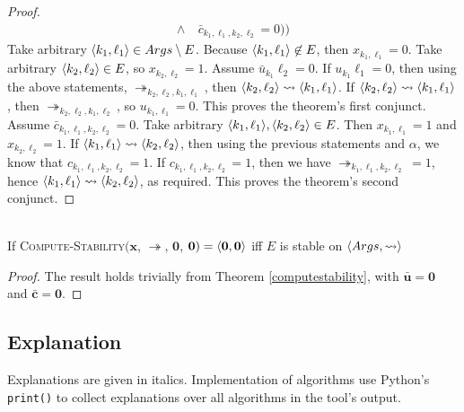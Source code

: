 \begin{theorem}
\begin{proof}
\begin{align*}
			\land\ &\bar{c}_{k_1,\ell_1,k_2,\ell_2}=0))
		\end{align*}
		Take arbitrary $\langle{k_1},{\ell_1}\rangle\in Args\setminus E$. Because $\langle{k_1},{\ell_1}\rangle\not\in E$, then $x_{k_1,\ell_1}=0$. Take arbitrary $\langle{k_2},{\ell_2}\rangle\in E$, so $x_{k_2,\ell_2}=1$. Assume $\bar{u}_{k_1}{\ell_2}=0$. If $u_{k_1}{\ell_1}=0$, then using the above statements, $\twoheadrightarrow_{k_2,\ell_2,k_1,\ell_1}$, then $\langle{k_2},{\ell_2}\rangle\rightsquigarrow\langle{k_1},{\ell_1}\rangle$. If $\langle{k_2},{\ell_2}\rangle\rightsquigarrow\langle{k_1},{\ell_1}\rangle$, then $\twoheadrightarrow_{k_2,\ell_2,k_1,\ell_2}$, so $u_{k_1,\ell_1}=0$. This proves the theorem's first conjunct.
		\linespace
		Assume $\bar{c}_{k_1,\ell_1,k_2,\ell_2}=0$. Take arbitrary $\langle{k_1},{\ell_1}\rangle,\langle{k_2},{\ell_2}\rangle\in E$. Then $x_{k_1,\ell_1}=1$ and $x_{k_2,\ell_2}=1$. If $\langle{k_1},{\ell_1}\rangle\rightsquigarrow\langle{k_2},{\ell_2}\rangle$, then using the previous statements and $\alpha$, we know that $c_{k_1,\ell_1,k_2,\ell_2}=1$. If $c_{k_1,\ell_1,k_2,\ell_2}=1$, then we have $\twoheadrightarrow_{k_1,\ell_1,k_2,\ell_2}=1$, hence $\langle{k_1},{\ell_1}\rangle\rightsquigarrow\langle{k_2},{\ell_2}\rangle$, as required. This proves the theorem's second conjunct.
	\end{proof}

\end{theorem}

\begin{corollary}\ \\
	If \textsc{Compute-Stability}$(\mathbf{x}$, $\twoheadrightarrow$, $\mathbf{0}$, $\mathbf{0})=\langle{\mathbf{0}},{\mathbf{0}}\rangle$ iff $E$ is stable on $\langle{Args},{\rightsquigarrow}\rangle$
	
	\begin{proof}
		The result holds trivially from Theorem \ref{computestability}, with $\bar{\mathbf{u}}=\mathbf{0}$ and $\bar{\mathbf{c}}=\mathbf{0}$. 
	\end{proof}
\end{corollary}

\subsection{Explanation}

Explanations are given in italics. Implementation of algorithms use Python's \verb|print()| to collect explanations over all algorithms in the tool's output.

